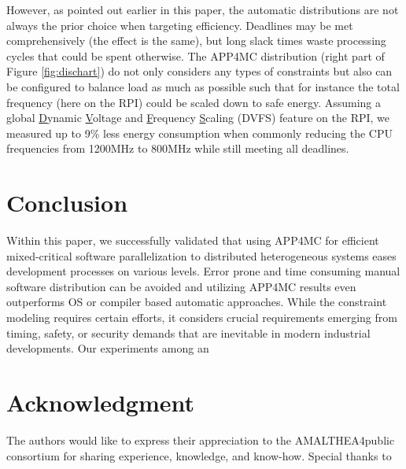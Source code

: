 \documentclass [a4paper,final,conference,10pt]{IDAACS}
\begin{document}
However, as pointed out earlier in this paper, the automatic distributions are not always the prior choice when targeting efficiency. Deadlines may be met comprehensively (the effect is the same), but long slack times waste processing cycles that could be spent otherwise. The APP4MC distribution (right part of Figure \ref{fig:dischart}) do not only considers any types of constraints but also can be configured to balance load as much as possible such that for instance the total frequency (here on the RPI) could be scaled down to safe energy. Assuming a global \underline{D}ynamic \underline{V}oltage and \underline{F}requency \underline{S}caling (DVFS) feature on the RPI, we measured up to 9\% less energy consumption when commonly reducing the CPU frequencies from 1200MHz to 800MHz while still meeting all deadlines.  %

\cite{LiXi13} \cite{Socci2015} \cite{Kritikakou2014} \cite{Xiao2016}

\section{Conclusion}
\label{sec:concl}
Within this paper, we successfully validated that using APP4MC for efficient mixed-critical software parallelization to distributed heterogeneous systems eases development processes on various levels. Error prone and time consuming manual software distribution can be avoided and utilizing APP4MC results even outperforms OS or compiler based automatic approaches. While the constraint modeling requires certain efforts, it considers crucial requirements emerging from timing, safety, or security demands that are inevitable in modern industrial developments. Our experiments among an 


\section*{Acknowledgment}
The authors would like to express their appreciation to the AMALTHEA4public consortium for sharing experience, knowledge, and know-how. Special thanks to 


\end{document}
